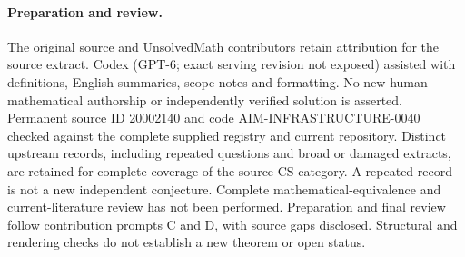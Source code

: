 \documentclass[11pt]{article}
\begin{document}
\paragraph{Preparation and review.}
The original source and UnsolvedMath contributors retain attribution for the source extract. Codex (GPT-6; exact serving revision not exposed) assisted with definitions, English summaries, scope notes and formatting. No new human mathematical authorship or independently verified solution is asserted. Permanent source ID 20002140 and code AIM-INFRASTRUCTURE-0040 checked against the complete supplied registry and current repository. Distinct upstream records, including repeated questions and broad or damaged extracts, are retained for complete coverage of the source CS category. A repeated record is not a new independent conjecture. Complete mathematical-equivalence and current-literature review has not been performed. Preparation and final review follow contribution prompts C and D, with source gaps disclosed. Structural and rendering checks do not establish a new theorem or open status.
\label{end:20002140}
\end{document}
